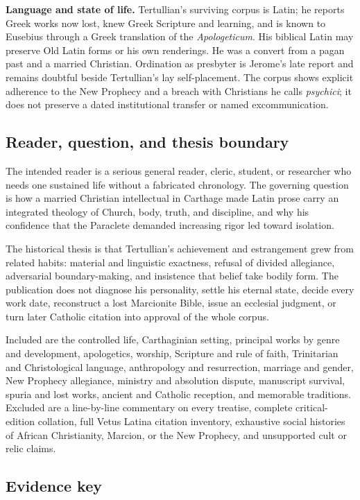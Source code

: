 \textbf{Language and state of life.} Tertullian's surviving corpus is Latin; he
reports Greek works now lost, knew Greek Scripture and learning, and is known to
Eusebius through a Greek translation of the \emph{Apologeticum}. His biblical
Latin may preserve Old Latin forms or his own renderings. He was a convert from
a pagan past and a married Christian. Ordination as presbyter is Jerome's late
report and remains doubtful beside Tertullian's lay self-placement. The corpus
shows explicit adherence to the New Prophecy and a breach with Christians he
calls \emph{psychici}; it does not preserve a dated institutional transfer or
named excommunication.

\subsection{Reader, question, and thesis boundary}

The intended reader is a serious general reader, cleric, student, or researcher
who needs one sustained life without a fabricated chronology. The governing
question is how a married Christian intellectual in Carthage made Latin prose
carry an integrated theology of Church, body, truth, and discipline, and why
his confidence that the Paraclete demanded increasing rigor led toward
isolation.

The historical thesis is that Tertullian's achievement and estrangement grew
from related habits: material and linguistic exactness, refusal of divided
allegiance, adversarial boundary-making, and insistence that belief take bodily
form. The publication does not diagnose his personality, settle his eternal
state, decide every work date, reconstruct a lost Marcionite Bible, issue an
ecclesial judgment, or turn later Catholic citation into approval of the whole
corpus.

Included are the controlled life, Carthaginian setting, principal works by
genre and development, apologetics, worship, Scripture and rule of faith,
Trinitarian and Christological language, anthropology and resurrection,
marriage and gender, New Prophecy allegiance, ministry and absolution dispute,
manuscript survival, spuria and lost works, ancient and Catholic reception, and
memorable traditions. Excluded are a line-by-line commentary on every treatise,
complete critical-edition collation, full Vetus Latina citation inventory,
exhaustive social histories of African Christianity, Marcion, or the New
Prophecy, and unsupported cult or relic claims.

\subsection{Evidence key}

